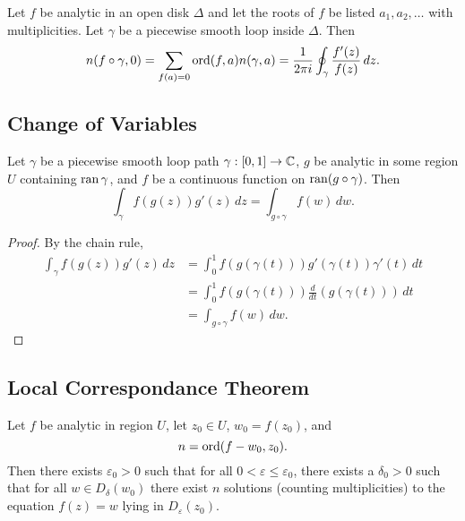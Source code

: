 \begin{theorem}
    Let $f$ be analytic in an open disk $\Delta$ and let 
    the roots of $f$ be listed $a_1, a_2, \ldots$ with
    multiplicities.
    Let $\gamma$ be a piecewise smooth loop inside $\Delta$.
    Then
    \[
        n(f \circ \gamma, 0)
        = \sum_{f(a) = 0} \operatorname{ord} (f, a) n(\gamma, a)
        = \frac{1}{2\pi i} \oint_{\gamma} \frac{f'(z)}{f(z)} \,
        dz.
    \]
\end{theorem}

\subsection{Change of Variables}

\begin{theorem}
    Let $\gamma$ be a piecewise smooth loop path $\gamma: [0,1]
    \to \operatorname{\mathbb{C}}$, $g$ be analytic in some region $U$ containing
    $\operatorname{ran} \gamma$, and
    $f$ be a continuous function on $\operatorname{ran} (g \circ \gamma)$.
    Then
    \[
        \int_{\gamma} f(g(z)) g'(z) \, dz = 
        \int_{g \circ \gamma} f(w) \, dw.
    \]
\end{theorem}

\begin{proof}
    By the chain rule,
    \begin{align*}
        \int_{\gamma} f(g(z)) g'(z) \, dz &= 
        \int_0^1 f(g(\gamma(t))) g'(\gamma(t)) \gamma'(t) \, dt\\
        &= \int_0^1 f(g(\gamma(t))) \frac{d}{dt} (g(\gamma(t)))
        \, dt \\
        &= \int_{g \circ \gamma} f(w) \, dw.
    \end{align*}
\end{proof}

\subsection{Local Correspondance Theorem}

\begin{theorem}[LCT]
    Let $f$ be analytic in region $U$, let $z_0 \in U$, $w_0 = f(z_0)$, 
    and
    \[ n = \operatorname{ord}(f-w_0, z_0). \]
    Then there exists $\varepsilon_0 > 0$ such that for all
    $0 < \varepsilon \le \varepsilon_0$, there exists a $\delta_0 > 0$
    such that for all $w \in D_{\delta} (w_0)$ there exist $n$
    solutions (counting multiplicities) to the equation $f(z) = w$
    lying in $D_{\varepsilon}(z_0)$.
\end{theorem}

